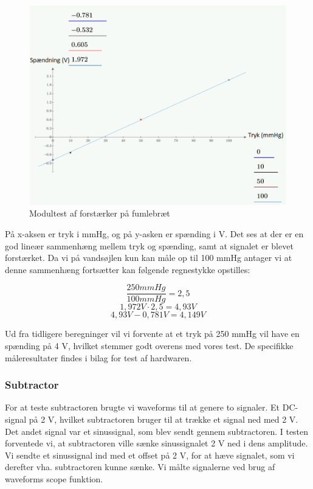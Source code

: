 \begin{figure}[h!]
	\centering
	\includegraphics[width=0.6\linewidth]{../Rapport/Implementering_og_test/Hardware/forstaerker}
	\caption{Modultest af forstærker på fumlebræt}
	\label{fig:forstaerker}
\end{figure}

\clearpage

På x-aksen er tryk i mmHg, og på y-asken er spænding i V. Det ses at der er en god lineær sammenhæng mellem tryk og spænding, samt at signalet er blevet forstærket. Da vi på vandsøjlen kun kan måle op til 100 mmHg antager vi at denne sammenhæng fortsætter kan følgende regnestykke opstilles: 

\[\frac{250 mmHg}{100 mmHg} = 2,5 \]
\[ 1,972 V \cdot 2,5 = 4,93 V \]
\[ 4,93 V - 0,781 V = 4,149 V \]

Ud fra tidligere beregninger vil vi forvente at et tryk på 250 mmHg vil have en spænding på 4 V, hvilket stemmer godt overens med vores test. De specifikke måleresultater findes i bilag for test af hardwaren.

\subsubsection{Subtractor}

For at teste subtractoren brugte vi waveforms til at genere to signaler. Et DC-signal på 2 V, hvilket subtractoren bruger til at trække et signal ned med 2 V. Det andet signal var et sinussignal, som blev sendt gennem subtractoren. I testen forventede vi, at subtractoren ville sænke sinussignalet 2 V ned i dens amplitude. Vi sendte et sinussignal ind med et offset på 2 V, for at hæve signalet, som vi derefter vha. subtractoren kunne sænke. Vi målte signalerne ved brug af waveforms scope funktion.

